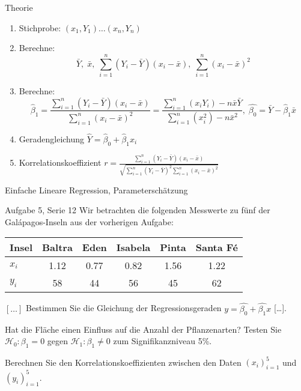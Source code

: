 \documentclass{beamer}
\begin{document}
\begin{frame}{Theorie}
\begin{enumerate}
\item Stichprobe: $(x_1,Y_1)\ldots(x_n, Y_n)$
\item Berechne:
$$
\bar{Y},\; \bar{x},\; \sum_{i=1}^n (Y_i-\bar{Y})(x_i-\bar{x}),\; \sum_{i=1}^n(x_i-\bar{x})^2
$$

\item Berechne:
$$
\hat{\beta}_1 = \frac{\sum_{i=1}^n
(Y_i-\bar{Y})(x_i-\bar{x})}{\sum_{i=1}^n(x_i-\bar{x})^2}=
\frac{\sum_{i=1}^n \left(x_iY_i\right)-n\bar{x}\bar{Y}}{\sum_{i=1}^n \left(x_i^2\right)-n\bar{x}^2},\;
\hat{\beta_0} = \bar{Y}-\hat{\beta}_1\bar{x}
$$

\item Geradengleichung $\hat{Y}=\hat{\beta}_0+\hat{\beta}_1 x_i$

\item Korrelationskoeffizient $r = \frac{\sum_{i=1}^n
    (Y_i-\bar{Y})(x_i-\bar{x})}{\sqrt{\sum_{i=1}^n(Y_i-\bar{Y})^2\sum_{i=1}^n(x_i-\bar{x})^2}}$
\end{enumerate}
\end{frame}

\begin{frame}{Einfache Lineare Regression, Parameterschätzung}
\begin{beamerboxesrounded}[shadow]{Aufgabe 5, Serie 12}
Wir betrachten die folgenden Messwerte zu fünf der Galápagos-Inseln aus der
vorherigen Aufgabe:

\begin{center}{\scriptsize\begin{tabular}{l|ccccc}\toprule
Insel & Baltra & Eden & Isabela & Pinta & Santa Fé\\\midrule
$x_i$&
 1.12 & 0.77 & 0.82 & 1.56 & 1.22\\
$y_i$&
  58 & 44 & 56 & 45 & 62\\
\bottomrule
\end{tabular}}\end{center}

\begin{outline}
\item $[\dots]$ Bestimmen Sie die Gleichung der Regressionsgeraden
$y=\hat{\beta_0}+\hat{\beta_1}x$ [\dots].
\textcolor{black!20}{\item Hat die Fläche einen Einfluss auf die Anzahl der Pflanzenarten?
Testen Sie $\mathcal{H}_0: \beta_1 = 0$ gegen $\mathcal{H}_1: \beta_1 \ne 0$
zum Signifikanzniveau 5\%.}

\item Berechnen Sie den Korrelationskoeffizienten zwischen den Daten
$(x_i)_{i=1}^5$ und $(y_i)_{i=1}^5$.
\end{outline}
\end{beamerboxesrounded}
\end{frame}
\end{document}
